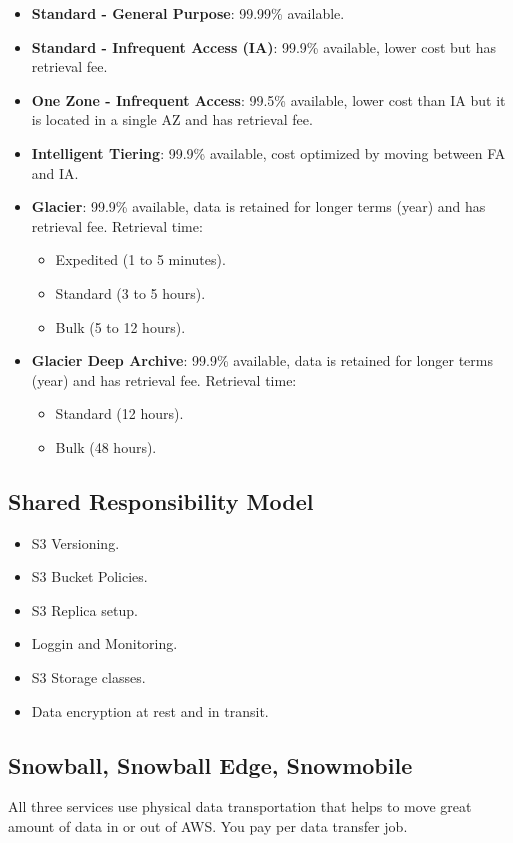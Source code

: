 \begin{itemize}
	\item{\textbf{Standard - General Purpose}: 99.99\% available.}
	\item{\textbf{Standard - Infrequent Access (IA)}: 99.9\% available, lower cost but has retrieval fee.}
	\item{\textbf{One Zone - Infrequent Access}: 99.5\% available, lower cost than IA but it is located in a single AZ and has retrieval fee.}
	\item{\textbf{Intelligent Tiering}: 99.9\% available, cost optimized by moving between FA and IA.}
	\item{\textbf{Glacier}: 99.9\% available, data is retained for longer terms (year) and has retrieval fee. Retrieval time:}
	\begin{itemize}
		\item{Expedited (1 to 5 minutes).}
		\item{Standard (3 to 5 hours).}
		\item{Bulk (5 to 12 hours).}
	\end{itemize}
	\item{\textbf{Glacier Deep Archive}: 99.9\% available, data is retained for longer terms (year) and has retrieval fee. Retrieval time:}
	\begin{itemize}
		\item{Standard (12 hours).}
		\item{Bulk (48 hours).}
	\end{itemize}
\end{itemize}

\subsection{Shared Responsibility Model}\label{subsec:shared-responsibility-model}
\begin{itemize}
	\item{S3 Versioning.}
	\item{S3 Bucket Policies.}
	\item{S3 Replica setup.}
	\item{Loggin and Monitoring.}
	\item{S3 Storage classes.}
	\item{Data encryption at rest and in transit.}
\end{itemize}

\subsection{Snowball, Snowball Edge, Snowmobile}\label{subsec:snowball-snowball-edge-snowmobile}
All three services use physical data transportation that helps to move great amount of data in or out of AWS. You pay per data transfer job.

